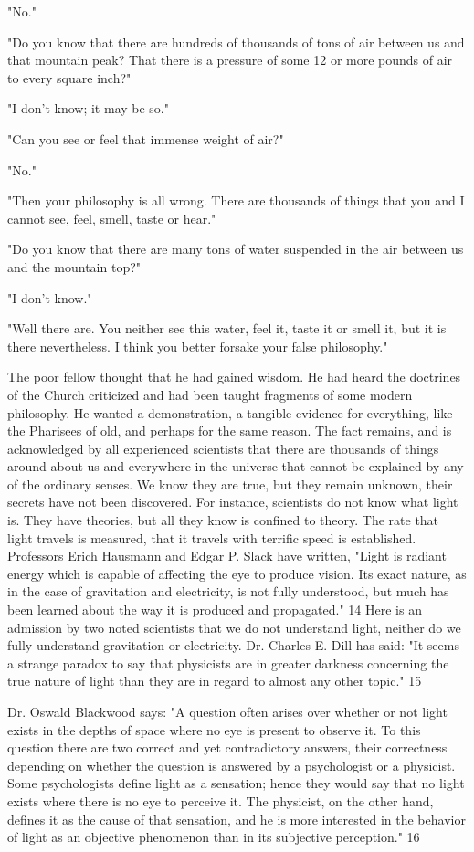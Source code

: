 "No."

"Do you know that there are hundreds of thousands of tons of air between us and that
mountain peak? That there is a pressure of some 12 or more pounds of air to every square
inch?"

"I don't know; it may be so."

"Can you see or feel that immense weight of air?"

"No."

"Then your philosophy is all wrong. There are thousands of things that you and I cannot see,
feel, smell, taste or hear."

"Do you know that there are many tons of water suspended in the air between us and the
mountain top?"

"I don't know."

"Well there are. You neither see this water, feel it, taste it or smell it, but it is there
nevertheless. I think you better forsake your false philosophy."

The poor fellow thought that he had gained wisdom. He had heard the doctrines of the
Church criticized and had been taught fragments of some modern philosophy. He wanted a
demonstration, a tangible evidence for everything, like the Pharisees of old, and perhaps for
the same reason. The fact remains, and is acknowledged by all experienced scientists that
there are thousands of things around about us and everywhere in the universe that cannot be
explained by any of the ordinary senses. We know they are true, but they remain unknown,
their secrets have not been discovered. For instance, scientists do not know what light is.
They have theories, but all they know is confined to theory. The rate that light travels is
measured, that it travels with terrific speed is established. Professors Erich Hausmann and
Edgar P. Slack have written, "Light is radiant energy which is capable of affecting the eye to
produce vision. Its exact nature, as in the case of gravitation and electricity, is not fully
understood, but much has been learned about the way it is produced and propagated." 14
Here is an admission by two noted scientists that we do not understand light, neither do we
fully understand gravitation or electricity. Dr. Charles E. Dill has said: "It seems a strange
paradox to say that physicists are in greater darkness concerning the true nature of light than
they are in regard to almost any other topic." 15

Dr. Oswald Blackwood says: "A question often arises over whether or not light exists in the
depths of space where no eye is present to observe it. To this question there are two correct
and yet contradictory answers, their correctness depending on whether the question is
answered by a psychologist or a physicist. Some psychologists define light as a sensation;
hence they would say that no light exists where there is no eye to perceive it. The physicist,
on the other hand, defines it as the cause of that sensation, and he is more interested in the
behavior of light as an objective phenomenon than in its subjective perception." 16

